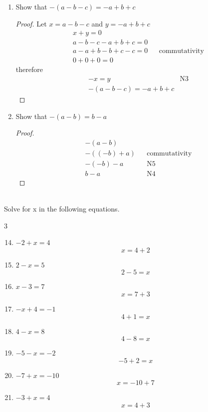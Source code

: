 \documentclass{article}
\begin{document}
\begin{enumerate}
\begin{proof}
\begin{align*}
&a + b + c -a + (-b) + (-c) = 0 \\
&a + (-a) + b + (-b) + c + (-c) = 0 &&\text{commutativity} \\
&0 + 0 + 0 = 0
\end{align*}
therefore
\begin{align*}
&-x = y &\text{N3} \\
&-(a+b+c) = -a + (-b) + (-c)
\end{align*}
\end{proof}
\item Show that $-(a-b-c) = -a + b + c$
\begin{proof}
Let $x = a-b-c$ and $y = -a + b + c$
\begin{align*}
&x + y = 0 \\
&a-b-c -a + b + c = 0 \\
&a-a + b -b + c -c = 0 &&\text{commutativity} \\
&0 + 0 + 0 = 0
\end{align*}
therefore
\begin{align*}
&-x = y &\text{N3} \\
&-(a-b-c) = -a + b + c
\end{align*}
\end{proof}
\item Show that $-(a-b)=b-a$
\begin{proof}
\begin{align*}
&-(a-b)\\
&-((-b)+a) &&\text{commutativity} \\
&-(-b)-a &&\text{N5} \\
&b-a &&\text{N4}
\end{align*}
\end{proof}
\end{enumerate}
\newpage
\leavevmode \\
Solve for x in the following equations.
\begin{multicols}{3}
\begin{enumerate}
\setcounter{enumi}{13}
 \item $-2+x=4$	\[x=4+2\]
 \item $2-x=5$	\[2-5=x\]
 \item $x-3=7$	\[x=7+3\]
 \item $-x+4=-1$	\[4+1=x\]
 \item $4-x=8$	\[4-8=x\]
 \item $-5-x=-2$	\[-5+2=x\]
 \item $-7+x=-10$	\[x=-10+7\]
 \item $-3+x=4$	\[x=4+3\]
\end{enumerate}
\end{multicols}
\end{document}
